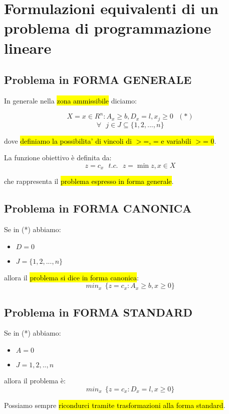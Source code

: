 \newpage
\section{Formulazioni equivalenti di un problema di programmazione lineare}


\subsection{Problema in FORMA GENERALE}

In generale nella \hl{zona ammissibile} diciamo:

$$X={x \in R^n : A_x \geq b, D_x = l, x_j \geq 0}\ \ \ (*)$$
$$\forall\ \ \ j \in J \subseteq \{1,2,...,n\}$$

dove \hl{definiamo la possibilita' di vincoli di $>$=, = e variabili $>$= 0}.

La funzione obiettivo è definita da: $$z = c_x\ \ \ t.c.\ \ \ z = \min z, x \in X$$

che rappresenta il \hl{problema espresso in forma generale}.


\subsection{Problema in FORMA CANONICA}

Se in (*) abbiamo:

\begin{itemize}
	\item $D = 0$
	\item $J = \{1,2,...,n\}$
\end{itemize}

allora il \hl{problema si dice in forma canonica}: $$min_x\ \ \{z = c_x : A_x \geq b, x \geq 0\}$$


\subsection{Problema in FORMA STANDARD}

Se in (*) abbiamo:

\begin{itemize}
	\item $A = 0$
	\item $J = {1,2,..,n}$
\end{itemize}

allora il problema è: $$min_x\ \ \{z = c_x: D_x = l, x \geq 0\}$$

Possiamo sempre \hl{ricondurci tramite trasformazioni alla forma standard}.


